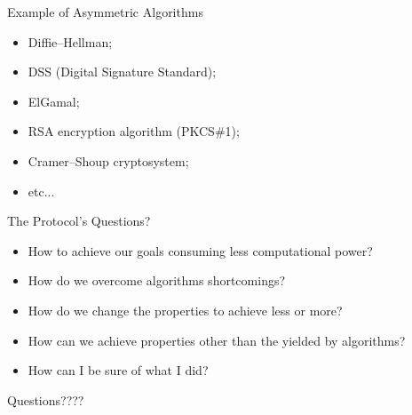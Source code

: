 \documentclass[12pt,table,xcolor={dvipsnames}]{beamer}
\begin{document}
\begin{frame}{Example of Asymmetric Algorithms}
\begin{itemize}
\item Diffie–Hellman;\pause
\item DSS (Digital Signature Standard);\pause
\item ElGamal;\pause
\item RSA encryption algorithm (PKCS\#1);\pause
\item Cramer–Shoup cryptosystem;\pause
\item etc...
\end{itemize}
\end{frame}

\begin{frame}{The Protocol's Questions?}
\begin{itemize}
\item How to achieve our goals consuming less computational power?\pause
\item How do we overcome algorithms shortcomings? \pause
\item How do we change the properties to achieve less or more?\pause
\item How can we achieve properties other than the yielded by algorithms?\pause
\item How can I be sure of what I did?
\end{itemize}
\end{frame}


{
\begin{frame}

{\LARGE Questions????}

\end{frame}
}
\end{document}
